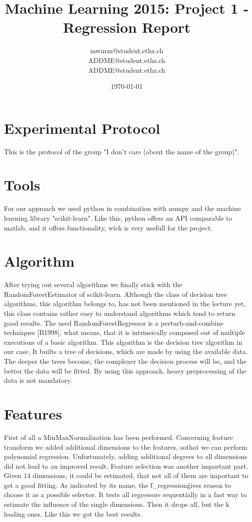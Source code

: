 \documentclass[a4paper, 11pt]{article}
\title{Machine Learning 2015: Project 1 - Regression Report}
\author{mwurm@student.ethz.ch\\ ADDME@student.ethz.ch\\ ADDME@student.ethz.ch\\}
\date{\today}
\begin{document}
\maketitle

\section*{Experimental Protocol}
This is the protocol of the group "I don't care (about the name of the group)".

\section{Tools}
For our approach we used python in combination with numpy and the machine learning library "scikit-learn". Like this, python offers an API comparable to matlab, and it offers functionality, wich is very usefull for the project.

\section{Algorithm}
After trying out several algorithms we finally stick with the RandomForestEstimator of scikit-learn. Although the class of decision tree algorithms, this algorithm belongs to, has not been mentioned in the lecture yet, this class contains rather easy to understand algorithms which tend to return good results.
The used RandomForestRegressor is a perturb-and-combine techniques [B1998], what means, that it is intrinsically composed out of multiple executions of a basic algorithm. This algorithm is the decision tree algorithm in our case.
It builts a tree of decisions, which are made by using the available data. The deeper the trees become, the complexer the decision process will be, and the better the data will be fitted. By using this approach, heavy preprocessing of the data is not mandatory.

\section{Features}
First of all a MinMaxNormalization has been performed.
Concerning feature transform we added additional dimensions to the features, sothat we can perform polynomial regression. Unfortunately, adding additional degrees to all dimensions did not lead to an improved result. 
Feature selection was another important part. Given 14 dimensions, it could be estimated, that not all of them are important to get a good fitting. As indicated by its name, the \"f\_regression\" gives reason to choose it as a possible selector. It tests all regressors sequentially in a fast way to estimate the influence of the single dimensions. Then it drops all, but the k leading ones. Like this we got the best results.
\end{document}
